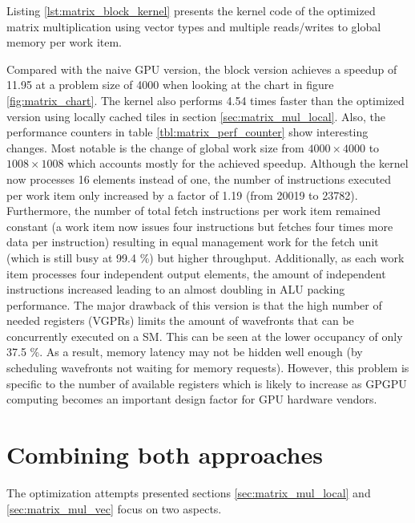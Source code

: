 Listing \ref{lst:matrix_block_kernel} presents the kernel code of the optimized matrix multiplication using vector types and multiple reads/writes to global memory per work item.



Compared with the naive GPU version, the block version achieves a speedup of 11.95 at a problem size of 4000 when looking at the chart in figure \ref{fig:matrix_chart}.
The kernel also performs 4.54 times faster than the optimized version using locally cached tiles in section \ref{sec:matrix_mul_local}.
Also, the performance counters in table \ref{tbl:matrix_perf_counter} show interesting changes. Most notable is the change of global work size from $4000 \times 4000$ to $1008 \times 1008$ which accounts mostly for the achieved speedup. Although the kernel now processes 16 elements instead of one, the number of instructions executed per work item only increased by a factor of 1.19 (from 20019 to 23782). Furthermore, the number of total fetch instructions per work item remained constant (a work item now issues four instructions but fetches four times more data per instruction) resulting in equal management work for the fetch unit (which is still busy at 99.4 \%) but higher throughput. Additionally, as each work item processes four independent output elements, the amount of independent instructions increased leading to an almost doubling in ALU packing performance. The major drawback of this version is that the high number of needed registers (VGPRs) limits the amount of wavefronts that can be concurrently executed on a SM. This can be seen at the lower occupancy of only 37.5 \%. As a result, memory latency may not be hidden well enough (by scheduling wavefronts not waiting for memory requests). However, this problem is specific to the number of available registers which is likely to increase as GPGPU computing becomes an important design factor for GPU hardware vendors.


\section{Combining both approaches}
The optimization attempts presented sections \ref{sec:matrix_mul_local} and \ref{sec:matrix_mul_vec} focus on two aspects.

